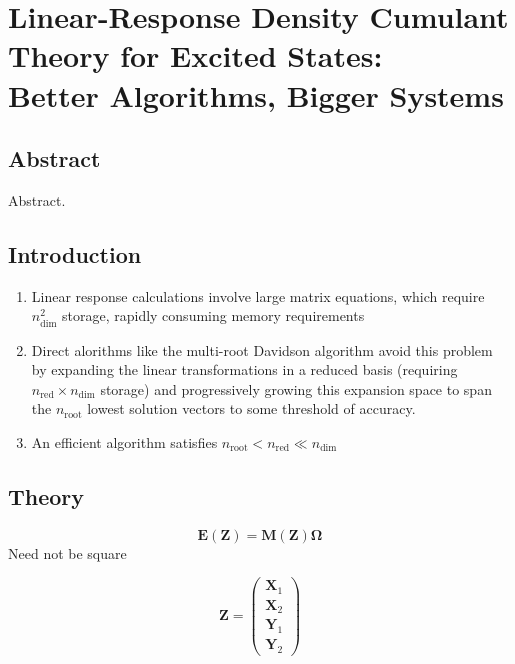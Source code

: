 \chapter[%
    Linear-Response Density Cumulant Theory for Excited States:\\
	Better Algorithms, Bigger Systems
]{%
    Linear-Response Density Cumulant Theory for Excited States:\\
	Better Algorithms, Bigger Systems
}
\label{ch:davidson}


\section{Abstract}

Abstract.


\section{Introduction}

\begin{enumerate}
    \item
        Linear response calculations involve large matrix equations, which
        require
        \(
            n_\mathrm{dim}^2
        \)
        storage, rapidly consuming memory requirements
    \item
        Direct alorithms like the multi-root Davidson
        algorithm\cite{Davidson:1975p87,Liu:1978p49} avoid this problem by
        expanding the linear transformations in a reduced basis
        (requiring \(n_\mathrm{red} \times n_\mathrm{dim}\) storage) and
        progressively growing this expansion space to span the
        \(n_\mathrm{root}\) lowest solution vectors to some threshold of
        accuracy.
    \item
        An efficient algorithm satisfies
        \(
            n_\mathrm{root} < n_\mathrm{red} \ll n_\mathrm{dim}
        \)
\end{enumerate}


\section{Theory}

\begin{equation}
    \mathbf{E}(\mathbf{Z})
    =
    \mathbf{M}(\mathbf{Z})
    \boldsymbol{\Omega}
\end{equation}
Need not be square

\begin{equation}
    \mathbf{Z}
    =
    \begin{pmatrix}
        \mathbf{X}_1 \\
        \mathbf{X}_2 \\
        \mathbf{Y}_1 \\
        \mathbf{Y}_2
    \end{pmatrix}
\end{equation}

